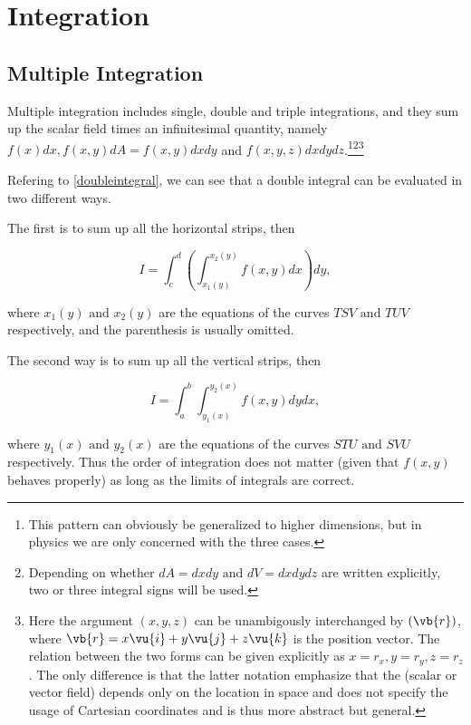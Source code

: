\documentclass[english,a4paper,12pt]{report}
\begin{document}
\chapter{Integration}
\section{Multiple Integration}

Multiple integration includes single, double and triple integrations, and they sum up the scalar field times an infinitesimal quantity, namely \(f(x)dx, f(x,y)dA = f(x,y)dxdy\) and \(f(x,y,z)dxdydz\).\footnote{ This pattern can obviously be generalized to higher dimensions, but in physics we are only concerned with the three cases.}\footnote{Depending on whether \(dA = dxdy \text { and } dV = dxdydz\) are written explicitly, two or three integral signs will be used.}\footnote{Here the argument \((x,y,z)\) can be unambigously interchanged by \((\vb{r} )\), where \(\vb{r} = x \vu{i} + y \vu{j} + z \vu{k} \) is the position vector. The relation between the two forms can be given explicitly as \(x = r_{x}, y = r_{y}, z = r_{z}\). The only difference is that the latter notation emphasize that the (scalar or vector field) depends only on the location in space and does not specify the usage of Cartesian coordinates and is thus more abstract but general.} 

Refering to \cref{doubleintegral}, we can see that a double integral can be evaluated in two different ways. 


The first is to sum up all the horizontal strips, then 

\begin{equation}
    I = \int_{c}^{d} \left( \int_{x_1 (y)}^{x_2 (y)} f(x,y) dx \right) dy,   
\end{equation}

where \(x_1 (y) \text { and } x_2 (y)\) are the equations of the curves \(TSV \text { and } TUV\) respectively, and the parenthesis is usually omitted.

The second way is to sum up all the vertical strips, then

\begin{equation}
    I = \int_{a}^{b} \int_{y_1 (x)}^{y_2 (x)} f(x,y) dy dx,
\end{equation}

where \(y_1 (x) \text { and } y_2 (x)\) are the equations of the curves \(STU \text { and } SVU\) respectively. Thus the order of integration does not matter (given that \(f(x,y)\) behaves properly) as long as the limits of integrals are correct.
\end{document}
